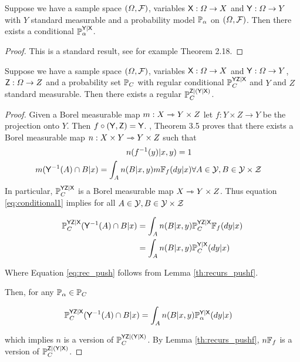 \begin{theorem}\label{th:reg_cond}
Suppose we have a sample space $(\Omega,\mathcal{F})$, variables $\mathsf{X}:\Omega\to X$ and $\mathsf{Y}:\Omega\to Y$ with $Y$ standard measurable and a probability model $\mathbb{P}_{\alpha}$ on $(\Omega,\mathcal{F})$. Then there exists a conditional $\mathbb{P}_\alpha^{\mathsf{Y}|\mathsf{X}}$.
\end{theorem}

\begin{proof}
This is a standard result, see for example \cite{cinlar_probability_2011} Theorem 2.18.
\end{proof}

\begin{theorem}\label{th:ho_cond_psets}
Suppose we have a sample space $(\Omega,\mathcal{F})$, variables $\mathsf{X}:\Omega\to X$ and $\mathsf{Y}:\Omega\to Y$, $\mathsf{Z}:\Omega\to Z$ and a probability set $\mathbb{P}_C$ with regular conditional $\mathbb{P}_C^{\mathsf{YZ}|\mathsf{X}}$ and $Y$ and $Z$ standard measurable. Then there exists a regular $\mathbb{P}_C^{\mathsf{Z}|(\mathsf{Y}|\mathsf{X})}$.
\end{theorem}

\begin{proof}
Given a Borel measurable map $m:X\rightarrowtriangle Y\times Z$ let $f:Y\times Z\to Y$ be the projection onto $Y$. Then $f\circ (\mathsf{Y},\mathsf{Z})=\mathsf{Y}$. \citet{bogachev_kantorovich_2020}, Theorem 3.5 proves that there exists a Borel measurable map $n:X\times Y\rightarrowtriangle Y\times Z$  such that 
\begin{align}
    n(f^{-1}(y)|x,y) = 1\label{eq:proper}\\
    m(\mathsf{Y}^{-1}(A)\cap B|x) = \int_A n(B|x,y) m\mathbb{F}_{f}(dy|x)&\forall A\in \mathcal{Y},B\in\mathcal{Y\times Z}\label{eq:conditional1}
\end{align}
In particular, $\mathbb{P}_C^{\mathsf{YZ}|\mathsf{X}}$ is a Borel measurable map $X\rightarrowtriangle Y\times Z$. Thus equation \ref{eq:conditional1} implies for all $A\in \mathcal{Y},B\in\mathcal{Y\times Z}$

\begin{align}
    \mathbb{P}_C^{\mathsf{YZ}|\mathsf{X}}(\mathsf{Y}^{-1}(A)\cap B|x) &= \int_A n(B|x,y) \mathbb{P}_C^{\mathsf{YZ}|\mathsf{X}}\mathbb{F}_{f}(dy|x)\\
    &=\int_A n(B|x,y) \mathbb{P}_C^{\mathsf{Y}|\mathsf{X}}(dy|x)\label{eq:rec_push}
\end{align}

Where Equation \ref{eq:rec_push} follows from Lemma \ref{th:recurs_pushf}.

Then, for any $\mathbb{P}_\alpha\in\mathbb{P}_C$

\begin{align}
    \mathbb{P}_C^{\mathsf{YZ}|\mathsf{X}}(\mathsf{Y}^{-1}(A)\cap B|x) &= \int_A n(B|x,y) \mathbb{P}_{\alpha}^{\mathsf{Y}|\mathsf{X}}(dy|x)
\end{align}

which implies $n$ is a version of $\mathbb{P}_C^{\mathsf{YZ}|(\mathsf{Y}|\mathsf{X})}$. By Lemma \ref{th:recurs_pushf}, $n\mathbb{F}_{f}$ is a version of $\mathbb{P}_C^{\mathsf{Z}|(\mathsf{Y}|\mathsf{X})}$.
\end{proof}

